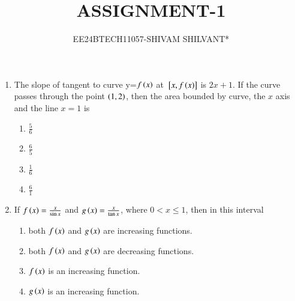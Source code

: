 \documentclass[journal]{IEEEtran}
\begin{document}

\onecolumn


\title{ASSIGNMENT-1}
\author{EE24BTECH11057-SHIVAM SHILVANT*}
\maketitle

\bigskip

\renewcommand{\thefigure}{\theenumi}
\renewcommand{\thetable}{\theenumi}
\begin{enumerate}[start=9]
\item The slope of tangent to curve y=$f\left(x\right)$ at ${}\left[x,f\left(x\right)\right]$ is $2x + 1$. If the curve passes through the point $\left(1,2\right)$, then the area bounded by curve, the $x$ axis and the line $x=1$ is
\hfill {}
\begin{multicols}{4}
\begin{enumerate}
    \item $\frac{5}{6}$
    \item $\frac{6}{5}$
    \item $\frac{1}{6}$
    \item $\frac{6}{1}$
\end{enumerate}
\end{multicols}
\item If $f\left(x\right)=\frac{x}{\sin{x}}$ and $g\left(x\right)=\frac{x}{\tan{x}}$, where $0<x\leq1$, then in this interval
\hfill {}
\begin{enumerate}
    \item both $f\left(x\right)$ and $g\left(x\right)$ are increasing functions.
    \item both $f\left(x\right)$ and $g\left(x\right)$ are decreasing functions.
    \item $f\left(x\right)$ is an increasing function.
    \item $g\left(x\right)$ is an increasing function.
\end{enumerate}


\end{enumerate}
\end{document}
